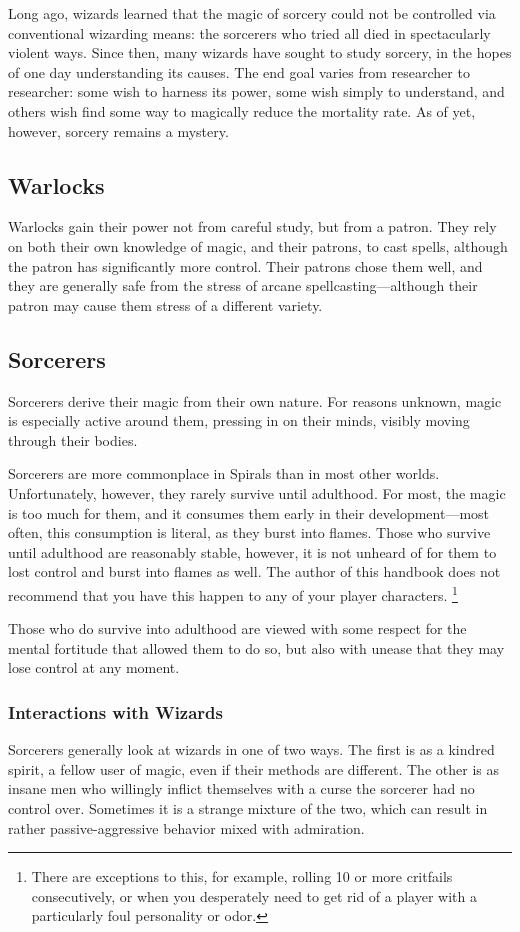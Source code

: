 \begin{multicols}{2}
Long ago, wizards learned that the magic of sorcery could not be controlled via conventional wizarding means: the sorcerers who tried all died in spectacularly violent ways.
Since then, many wizards have sought to study sorcery, in the hopes of one day understanding its causes.
The end goal varies from researcher to researcher: some wish to harness its power, some wish simply to understand, and others wish find some way to magically reduce the mortality rate.
As of yet, however, sorcery remains a mystery.

\subsection{Warlocks}

Warlocks gain their power not from careful study, but from a patron.
They rely on both their own knowledge of magic, and their patrons, to cast spells, although the patron has significantly more control.
Their patrons chose them well, and they are generally safe from the stress of arcane spellcasting---although their patron may cause them stress of a different variety. 


\subsection{Sorcerers}
Sorcerers derive their magic from their own nature.
For reasons unknown, magic is especially active around them, pressing in on their minds, visibly moving through their bodies.

Sorcerers are more commonplace in Spirals than in most other worlds.
Unfortunately, however, they rarely survive until adulthood.
For most, the magic is too much for them, and it consumes them early in their development---most often, this consumption is literal, as they burst into flames.
Those who survive until adulthood are reasonably stable, however, it is not unheard of for them to lost control and burst into flames as well.
The author of this handbook does not recommend that you have this happen to any of your player characters.
\footnote{There are exceptions to this, for example, rolling 10 or more critfails consecutively, or when you desperately need to get rid of a player with a particularly foul personality or odor.}

Those who do survive into adulthood are viewed with some respect for the mental fortitude that allowed them to do so, but also with unease that they may lose control at any moment.

\subsubsection{Interactions with Wizards}
Sorcerers generally look at wizards in one of two ways.
The first is as a kindred spirit, a fellow user of magic, even if their methods are different.
The other is as insane men who willingly inflict themselves with a curse the sorcerer had no control over.
Sometimes it is a strange mixture of the two, which can result in rather passive-aggressive behavior mixed with admiration.


\end{multicols}
